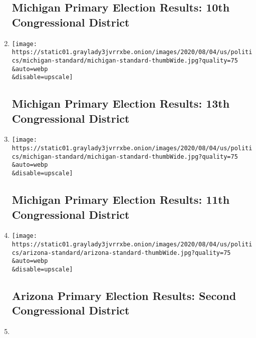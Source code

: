 \begin{enumerate}
  \hypertarget{michigan-primary-election-results-10th-congressional-district}{%
  \subsection{Michigan Primary Election Results: 10th Congressional
  District}\label{michigan-primary-election-results-10th-congressional-district}}
\item
  \href{/interactive/2020/08/04/us/elections/results-michigan-house-district-13-primary-election.html}{}

  \texttt{[image: https://static01.graylady3jvrrxbe.onion/images/2020/08/04/us/politics/michigan-standard/michigan-standard-thumbWide.jpg?quality=75\\\&auto=webp\\\&disable=upscale]}

  \hypertarget{michigan-primary-election-results-13th-congressional-district}{%
  \subsection{Michigan Primary Election Results: 13th Congressional
  District}\label{michigan-primary-election-results-13th-congressional-district}}
\item
  \href{/interactive/2020/08/04/us/elections/results-michigan-house-district-11-primary-election.html}{}

  \texttt{[image: https://static01.graylady3jvrrxbe.onion/images/2020/08/04/us/politics/michigan-standard/michigan-standard-thumbWide.jpg?quality=75\\\&auto=webp\\\&disable=upscale]}

  \hypertarget{michigan-primary-election-results-11th-congressional-district}{%
  \subsection{Michigan Primary Election Results: 11th Congressional
  District}\label{michigan-primary-election-results-11th-congressional-district}}
\item
  \href{/interactive/2020/08/04/us/elections/results-arizona-house-district-2-primary-election.html}{}

  \texttt{[image: https://static01.graylady3jvrrxbe.onion/images/2020/08/04/us/politics/arizona-standard/arizona-standard-thumbWide.jpg?quality=75\\\&auto=webp\\\&disable=upscale]}

  \hypertarget{arizona-primary-election-results-second-congressional-district}{%
  \subsection{Arizona Primary Election Results: Second Congressional
  District}\label{arizona-primary-election-results-second-congressional-district}}
\item
  \href{/interactive/2020/08/04/us/elections/results-arizona-primary-elections.html}{}


\end{enumerate}
